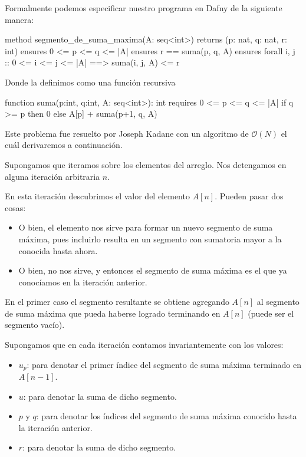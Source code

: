 \documentclass[12pt, a4paper, openany, fleqn]{book}
\begin{document}
    Formalmente podemos especificar nuestro programa en Dafny de la siguiente manera:

    \begin{dafny}
    method segmento_de_suma_maxima(A: seq<int>)
        returns (p: nat, q: nat, r: int)
        ensures 0 <= p <= q <= |A|
        ensures r == suma(p, q, A)
        ensures forall i, j :: 0 <= i <= j <= |A| ==> suma(i, j, A) <= r
    {
    }
    \end{dafny}

    Donde  la definimos como una función recursiva

    \begin{dafny}
    function suma(p:int, q:int, A: seq<int>): int
        requires 0 <= p <= q <= |A|
    {
        if q >= p then 0 else A[p] + suma(p+1, q, A)
    }
    \end{dafny}

    Este problema fue resuelto por Joseph Kadane con un algoritmo de $\mathcal{O}(N)$ el cuál derivaremos a continuación.

    Supongamos que iteramos sobre los elementos del arreglo. Nos detengamos en alguna iteración arbitraria $n$.

    En esta iteración descubrimos el valor del elemento $A[n]$. Pueden pasar dos cosas:
    \begin{itemize}
        \item O bien, el elemento nos sirve para formar un nuevo segmento de suma máxima, pues incluirlo resulta en un segmento con sumatoria mayor a la conocida hasta ahora.
        \item O bien, no nos sirve, y entonces el segmento de suma máxima es el que ya conocíamos en la iteración anterior.
    \end{itemize}

    En el primer caso el segmento resultante se obtiene agregando $A[n]$ al segmento de suma máxima que pueda haberse logrado terminando en $A[n]$ (puede ser el segmento vacío).

    Supongamos que en cada iteración contamos invariantemente con los valores:
    \begin{itemize}
        \item $u_p$: para denotar el primer índice del segmento de suma máxima terminado en $A[n - 1]$.
        \item $u$: para denotar la suma de dicho segmento.
        \item $p$ y $q$: para denotar los índices del segmento de suma máxima conocido hasta la iteración anterior.
        \item $r$: para denotar la suma de dicho segmento.
    \end{itemize}
\end{document}
